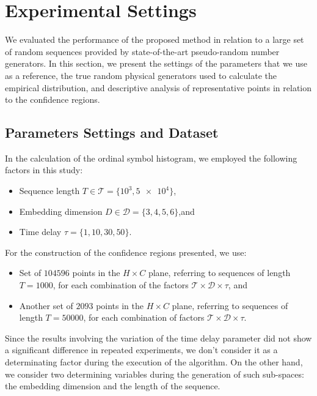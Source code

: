 \section{Experimental Settings}

We evaluated the performance of the proposed method in relation to a large set of random sequences provided by state-of-the-art pseudo-random number generators.
In this section, we present the settings of the parameters that we use as a reference, the true random physical generators used to calculate the empirical distribution, and descriptive analysis of representative points in relation to the confidence regions.

\subsection{Parameters Settings and Dataset}

In the calculation of the ordinal symbol histogram, we employed the following factors in this study:
\begin{itemize}
\item Sequence length $T\in\mathcal T=\{10^3, \num[scientific-notation=true]{5 e4}\}$,
\item Embedding dimension $D\in\mathcal D=\{3, 4, 5, 6\}$,and
\item Time delay $\tau=\{1, 10, 30, 50\}$.
\end{itemize}

For the construction of the confidence regions presented, we use:
\begin{itemize}
    \item Set of $104596$ points in the $H \times C$ plane, referring to sequences of length $T = 1000$, for each combination of the factors $\mathcal T \times \mathcal D \times \mathcal{\tau}$, and
    \item  Another set of $2093$ points in the $H \times C$ plane, referring to sequences of length $T = 50000$, for each combination of factors $\mathcal T \times \mathcal D \times \mathcal{\tau}$.
\end{itemize}
Since the results involving the variation of the time delay parameter did not show a significant difference in repeated experiments, we don't consider it as a determinating factor during the execution of the algorithm.
On the other hand, we consider two determining variables during the generation of such sub-spaces: the embedding dimension and the length of the sequence.

